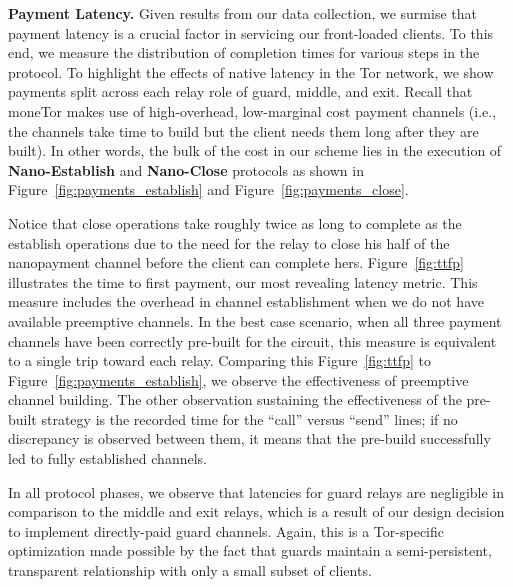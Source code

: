 \medskip \noindent \textbf{Payment Latency.}
Given results from our data collection, we surmise that payment latency is a crucial factor in servicing our front-loaded clients.
To this end, we measure the distribution of completion times for various steps in the protocol.
To highlight the effects of native latency in the Tor network, we show payments split across each relay role of guard, middle, and exit.
Recall that moneTor makes use of high-overhead, low-marginal cost payment channels (i.e., the channels take time to build but the client needs them long after they are built).
In other words, the bulk of the cost in our scheme lies in the execution of \textbf{Nano-Establish} and \textbf{Nano-Close} protocols as shown in Figure~\ref{fig:payments_establish} and Figure~\ref{fig:payments_close}.

Notice that close operations take roughly twice as long to complete as the establish operations due to the need for the relay to close his half of the nanopayment channel before the client can complete hers.
Figure~\ref{fig:ttfp} illustrates the time to first payment, our most revealing latency metric.
This measure includes the overhead in channel establishment when we do not have available preemptive channels.
In the best case scenario, when all three payment channels have been correctly pre-built for the circuit, this measure is equivalent to a single trip toward each relay.
Comparing this Figure~\ref{fig:ttfp} to Figure~\ref{fig:payments_establish}, we observe the effectiveness of preemptive channel building.
The other observation sustaining the effectiveness of the pre-built strategy is the recorded time for the ``call'' versus ``send'' lines; if no discrepancy is observed between them, it means that the pre-build successfully led to fully established channels.

In all protocol phases, we observe that latencies for guard relays are negligible in comparison to the middle and exit relays, which is a result of our design decision to implement directly-paid guard channels.
Again, this is a Tor-specific optimization made possible by the fact that guards maintain a semi-persistent, transparent relationship with only a small subset of clients.


